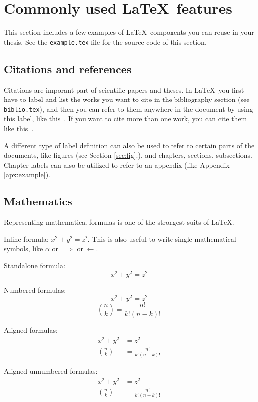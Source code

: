\section{Commonly used \LaTeX\  features}

This section includes a few examples of \LaTeX\  components you can reuse in your thesis. See the \texttt{example.tex} file for the source code of this section.

\subsection{Citations and references}
Citations are imporant part of scientific papers and theses. In \LaTeX\  you first have to label and list the works you want to cite in the bibliography section (see \texttt{biblio.tex}), and then you can refer to them anywhere in the document by using this label, like this~\cite{erlangdocs}. If you want to cite more than one work, you can cite them like this~\cite{refactorerl1, refactorerl2}.

A different type of label definition can also be used to refer to certain parts of the documents, like figures (see Section \ref{sec:fig}.), and chapters, sections, subsections. Chapter labels can also be utilized to refer to an appendix (like Appendix \ref{apx:example}). 

\subsection{Mathematics}
Representing mathematical formulas is one of the strongest suits of \LaTeX.

Inline formula: $x^2 + y^2 = z^2$. This is also useful to write single mathematical symbols, like $\alpha$ or $\implies$ or $\leftarrow$.

Standalone formula:
$$ x^2 + y^2 = z^2 $$

Numbered formulas:
\begin{equation}
x^2 + y^2 = z^2
\end{equation}
\begin{equation}
\binom{n}{k} = \frac{n!}{k!(n-k)!}
\end{equation}

Aligned formulas:
\begin{align}
x^2 + y^2 &= z^2 \\
\binom{n}{k} &= \frac{n!}{k!(n-k)!}
\end{align}

Aligned unnumbered formulas:
\begin{align*}
x^2 + y^2 &= z^2 \\
\binom{n}{k} &= \frac{n!}{k!(n-k)!}
\end{align*}

